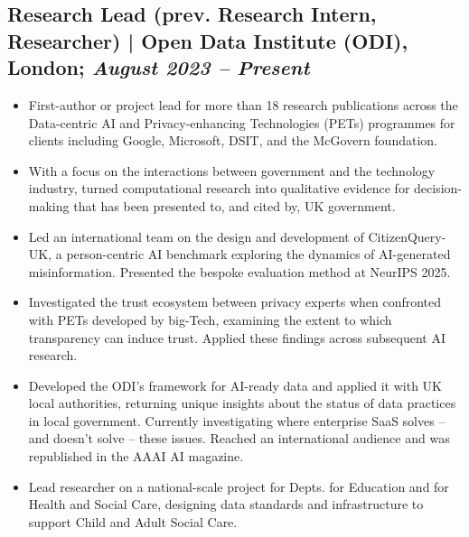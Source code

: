 \documentclass[a4paper,10pt]{article}
\begin{document}
\subsection*{Research Lead (prev. Research Intern, Researcher) | Open Data Institute (ODI), London; \textit{August 2023 – Present}}
\begin{itemize}
    \item First-author or project lead for more than 18 research publications across the Data-centric AI and Privacy-enhancing Technologies (PETs) programmes for clients including Google, Microsoft, DSIT, and the McGovern foundation. 
    \item With a focus on the interactions between government and the technology industry, turned computational research into qualitative evidence for decision-making that has been presented to, and cited by, UK government. 
    \item Led an international team on the design and development of CitizenQuery-UK, a person-centric AI benchmark exploring the dynamics of AI-generated misinformation. Presented the bespoke evaluation method at NeurIPS 2025.
    \item Investigated the trust ecosystem between privacy experts when confronted with PETs developed by big-Tech, examining the extent to which transparency can induce trust. Applied these findings across subsequent AI research.
    \item Developed the ODI's framework for AI-ready data and applied it with UK local authorities, returning unique insights about the status of data practices in local government. Currently investigating where enterprise SaaS solves -- and doesn't solve -- these issues. Reached an international audience and was republished in the AAAI AI magazine.
    \item Lead researcher on a national-scale project for Depts. for Education and for Health and Social Care, designing data standards and infrastructure to support Child and Adult Social Care.
\end{itemize}
\end{document}
